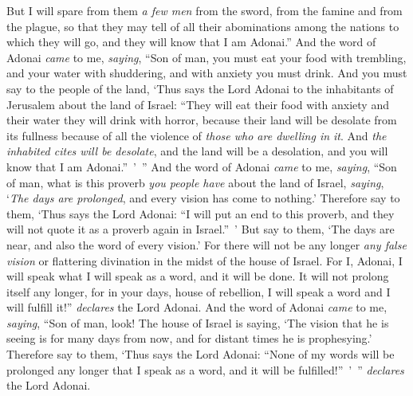 \begin{biblechapter}
\verse But I will spare from them \textit{a few men} from the sword, from the famine and from the plague, so that they may tell of all their abominations among the nations to which they will go, and they will know that I am Adonai.”
\verse And the word of Adonai \textit{came} to me, \textit{saying},
\verse “Son of man, you must eat your food with trembling, and your water with shuddering, and with anxiety you must drink.
\verse And you must say to the people of the land, ‘Thus says the Lord Adonai to the inhabitants of Jerusalem about the land of Israel: “They will eat their food with anxiety and their water they will drink with horror, because their land will be desolate from its fullness because of all the violence of \textit{those who are dwelling in it}.
\verse And \textit{the inhabited cites will be desolate}, and the land will be a desolation, and you will know that I am Adonai.” ’ ”
\verse And the word of Adonai \textit{came} to me, \textit{saying},
\verse “Son of man, what is this proverb \textit{you people have} about the land of Israel, \textit{saying}, ‘\textit{The days are prolonged}, and every vision has come to nothing.’
\verse Therefore say to them, ‘Thus says the Lord Adonai: “I will put an end to this proverb, and they will not quote it as a proverb again in Israel.” ’ But say to them, ‘The days are near, and also the word of every vision.’
\verse For there will not be any longer \textit{any false vision} or flattering divination in the midst of the house of Israel.
\verse For I, Adonai, I will speak what I will speak as a word, and it will be done. It will not prolong itself any longer, for in your days, house of rebellion, I will speak a word and I will fulfill it!” \textit{declares} the Lord Adonai.
\verse And the word of Adonai \textit{came} to me, \textit{saying},
\verse “Son of man, look! The house of Israel is saying, ‘The vision that he is seeing is for many days from now, and for distant times he is prophesying.’
\verse Therefore say to them, ‘Thus says the Lord Adonai: “None of my words will be prolonged any longer that I speak as a word, and it will be fulfilled!” ’ ” \textit{declares} the Lord Adonai.
\end{biblechapter}

